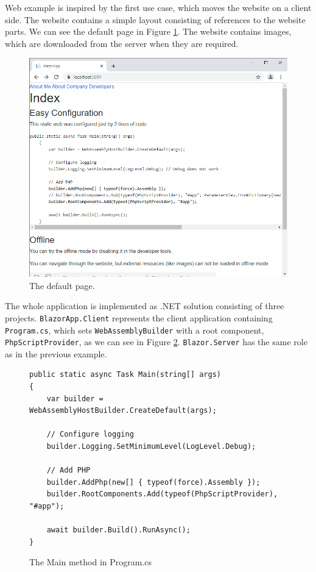 Web example is inspired by the first use case, which moves the website on a client side.
The website contains a simple layout consisting of references to the website parts.
We can see the default page in Figure \ref{img28:website}.
The website contains images, which are downloaded from the server when they are required.
\par
\begin{figure}[!b]\centering
\includegraphics[scale=0.5]{./img/Web}
\caption{The default page.}
\label{img28:website}
\end{figure} 
\par
The whole application is implemented as .NET solution consisting of three projects.
\texttt{BlazorApp.Client} represents the client application containing \texttt{Program.cs}, which sets \texttt{WebAssemblyBuilder} with a root component, \texttt{PhpScriptProvider}, as we can see in Figure \ref{img20:program}.
\texttt{Blazor.Server} has the same role as in the previous example.
\par
\begin{figure}
\begin{lstlisting}
public static async Task Main(string[] args)
{
	var builder = WebAssemblyHostBuilder.CreateDefault(args);

	// Configure logging
	builder.Logging.SetMinimumLevel(LogLevel.Debug);

	// Add PHP
	builder.AddPhp(new[] { typeof(force).Assembly });
	builder.RootComponents.Add(typeof(PhpScriptProvider), "#app");
            
	await builder.Build().RunAsync();
}
\end{lstlisting}
\caption{The Main method in Program.cs}
\label{img20:program}
\end{figure}
